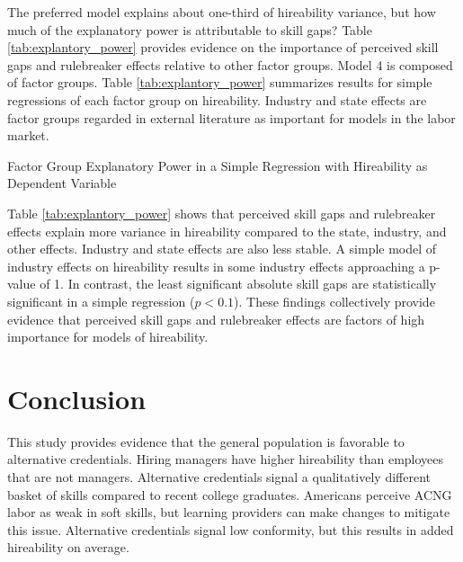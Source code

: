 \documentclass[review]{elsarticle}
\begin{document}
The preferred model explains about one-third of hireability variance,
but how much of the explanatory power is attributable to skill gaps?
Table \ref{tab:explantory_power} provides evidence on the importance of perceived skill gaps and rulebreaker effects
relative to other factor groups.
Model 4 is composed of factor groups.
Table \ref{tab:explantory_power} summarizes results for simple regressions of each factor group on hireability.
Industry and state effects are factor groups regarded in external literature as important for models in the labor market.

\begin{table}
    \caption{Factor Group Explanatory Power in a Simple Regression with Hireability as Dependent Variable}
    \resizebox{\columnwidth}{!}{
        
    }
    \label{tab:explantory_power}
\end{table}

Table \ref{tab:explantory_power} shows that perceived skill gaps and rulebreaker effects explain more
variance in hireability compared to the state, industry, and other effects.
Industry and state effects are also less stable.
A simple model of industry effects on hireability results in some industry effects approaching a p-value of 1.
In contrast, the least significant absolute skill gaps are statistically significant in a simple regression ($p < 0.1$).
These findings collectively provide evidence that perceived skill gaps and rulebreaker
effects are factors of high importance for models of hireability.

\section{Conclusion}

This study provides evidence that the general population is favorable to alternative credentials.
Hiring managers have higher hireability than employees that are not managers.
Alternative credentials signal a qualitatively different basket of skills compared to recent college graduates.
Americans perceive ACNG labor as weak in soft skills,
but learning providers can make changes to mitigate this issue.
Alternative credentials signal low conformity, but this results in added hireability on average.
\end{document}
